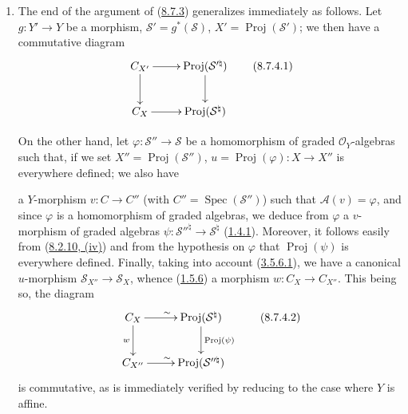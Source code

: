 \begin{remark}[8.7.4]
\label{II.8.7.4}
\begin{enumerate}
  \item[\rm{(i)}] The end of the argument of
  (\hyperref[II.8.7.3]{8.7.3}) generalizes immediately as
  follows. Let $g:Y'\to Y$ be a morphism,
  $\mathcal{S}'=g^*(\mathcal{S})$, $X'=\operatorname{Proj}(\mathcal{S}')$;
  we then have a commutative diagram
  \begin{equation}
  \label{II.8.7.4.1}
    \xymatrix{
      C_{X'}\ar[r]\ar[d] &
      \operatorname{Proj}(\mathcal{S}'^{\natural})\ar[d]\\
      C_X\ar[r] & \operatorname{Proj}(\mathcal{S}^{\natural})
    }
  \tag{8.7.4.1}
  \end{equation}

  On the other hand, let $\varphi:\mathcal{S}''\to\mathcal{S}$ be a
  homomorphism of graded $\mathcal{O}_Y$-algebras such that, if we set
  $X''=\operatorname{Proj}(\mathcal{S}'')$,
  $u=\operatorname{Proj}(\varphi):X\to X''$ is everywhere defined; we also
  have

  a $Y$-morphism $v:C\to C''$ (with
  $C''=\operatorname{Spec}(\mathcal{S}'')$) such that
  $\mathcal{A}(v)=\varphi$, and since $\varphi$ is a homomorphism of graded
  algebras, we deduce from $\varphi$ a $v$-morphism of graded algebras
  $\psi:\mathcal{S}''^{\natural}\to\mathcal{S}^{\natural}$
  (\hyperref[II.1.4.1]{1.4.1}). Moreover, it follows easily from
  (\hyperref[II.8.2.10]{8.2.10, (iv)}) and from the hypothesis on $\varphi$
  that $\operatorname{Proj}(\psi)$ is everywhere defined. Finally, taking into
  account (\hyperref[II.3.5.6.1]{3.5.6.1}), we have a canonical
  $u$-morphism $\mathcal{S}_{X''}\to\mathcal{S}_X$, whence
  (\hyperref[II.1.5.6]{1.5.6}) a morphism $w:C_X\to C_{X''}$. This being
  so, the diagram
  \begin{equation}
  \label{II.8.7.4.2}
    \xymatrix{
      C_X\ar[r]^{\sim}\ar[d]_{w} &
      \operatorname{Proj}(\mathcal{S}^{\natural})
        \ar[d]^{\operatorname{Proj}(\psi)}\\
      C_{X''}\ar[r]^{\sim} & \operatorname{Proj}(\mathcal{S}''^{\natural})
    }
  \tag{8.7.4.2}
  \end{equation}
  is commutative, as is immediately verified by reducing to the case where
  $Y$ is affine.


\end{enumerate}
\end{remark}
